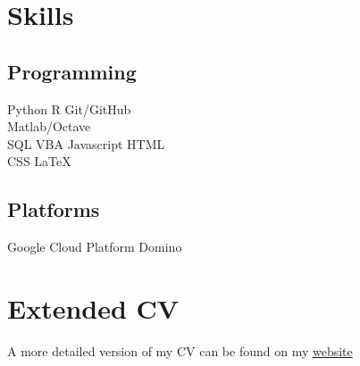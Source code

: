 \documentclass[]{cv-template}
\begin{document}
\begin{minipage}[t]{0.33\textwidth}


\section{Skills}
\subsection{Programming}
Python \textbullet{} R \textbullet{} Git/GitHub \\
Matlab/Octave\\ 
SQL \textbullet{} VBA \textbullet{} Javascript \textbullet{} HTML \\
CSS \textbullet{} \LaTeX\
\vspace{1.5mm} %
\subsection{Platforms}
Google Cloud Platform \textbullet{} Domino
\sectionsep



\section{Extended CV}
A more detailed version of my CV can be found on my \href{http://www.jackgrimes.uk/bio/}{website}\\

%
%

\end{minipage} 
\end{document}
